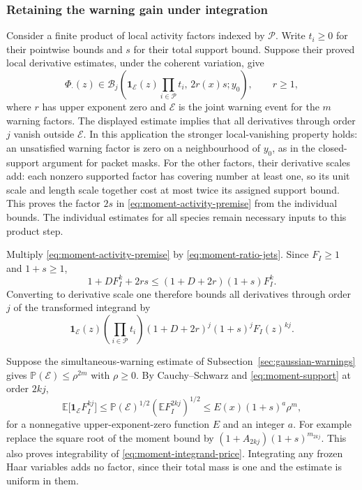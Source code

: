 \subsubsection{Retaining the warning gain under integration}
Consider a finite product of local activity factors indexed by
$\mathcal P$. Write $t_i\ge0$ for their pointwise bounds and
$s$ for their total support bound. Suppose their proved local
derivative estimates, under the coherent variation, give
\begin{equation}\label{eq:moment-activity-premise}
 \Phi_{\cdot}(z)\in
 \mathcal B_j\left(\mathbf1_{\mathcal E}(z)
                   \prod_{i\in\mathcal P}t_i,\,2r(x)s;y_0\right),
 \qquad r\ge1,
\end{equation}
where $r$ has upper exponent zero and $\mathcal E$ is the joint
warning event for the $m$ warning factors. The displayed estimate
implies that all derivatives through order $j$ vanish outside
$\mathcal E$. In this application the stronger local-vanishing
property holds: an unsatisfied warning factor is zero on a
neighbourhood of $y_0$, as in the closed-support argument for
packet masks. For the
other factors, their derivative scales add: each nonzero supported
factor has covering number at least one, so its unit scale and
length scale together cost at most twice its assigned support
bound. This proves the factor $2s$ in
\eqref{eq:moment-activity-premise} from the individual bounds.
The individual estimates for all species remain necessary inputs
to this product step.

Multiply \eqref{eq:moment-activity-premise} by
\eqref{eq:moment-ratio-jets}. Since $F_I\ge1$ and $1+s\ge1$,
\[
 1+DF_I^k+2rs\le(1+D+2r)(1+s)F_I^k.
\]
Converting to derivative scale one therefore bounds all derivatives
through order $j$ of the transformed integrand by
\begin{equation}\label{eq:moment-integrand-price}
 \mathbf1_{\mathcal E}(z)
 \left(\prod_{i\in\mathcal P}t_i\right)
 (1+D+2r)^j(1+s)^jF_I(z)^{kj}.
\end{equation}

Suppose the simultaneous-warning estimate of
Subsection~\ref{sec:gaussian-warnings} gives
$\mathbb P(\mathcal E)\le\rho^{2m}$ with $\rho\ge0$.
By Cauchy--Schwarz and \eqref{eq:moment-support} at order $2kj$,
\[
 \mathbb E\bigl[\mathbf1_{\mathcal E}F_I^{kj}\bigr]
 \le\mathbb P(\mathcal E)^{1/2}
             (\mathbb EF_I^{2kj})^{1/2}
 \le E(x)(1+s)^a\rho^m,
\]
for a nonnegative upper-exponent-zero function $E$ and an integer
$a$. For example replace the square root of the moment bound by
$(1+A_{2kj})(1+s)^{m_{2kj}}$. This also proves integrability of
\eqref{eq:moment-integrand-price}. Integrating any frozen Haar
variables adds no factor, since their total mass is one and the
estimate is uniform in them.

